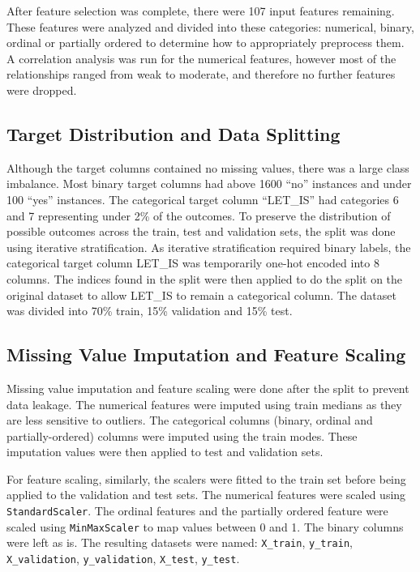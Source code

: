 \documentclass[11pt]{article}
\begin{document}
After feature selection was complete, there were 107 input features remaining. These features were analyzed and divided into these categories: numerical, binary, ordinal or partially ordered to determine how to appropriately preprocess them. A correlation analysis was run for the numerical features, however most of the relationships ranged from weak to moderate, and therefore no further features were dropped.

\subsection{Target Distribution and Data Splitting}

Although the target columns contained no missing values, there was a large class imbalance. Most binary target columns had above 1600 ``no'' instances and under 100 ``yes'' instances. The categorical target column ``LET\_IS'' had categories 6 and 7 representing under 2\% of the outcomes. To preserve the distribution of possible outcomes across the train, test and validation sets, the split was done using iterative stratification. As iterative stratification required binary labels, the categorical target column LET\_IS was temporarily one-hot encoded into 8 columns. The indices found in the split were then applied to do the split on the original dataset to allow LET\_IS to remain a categorical column. The dataset was divided into 70\% train, 15\% validation and 15\% test.

\subsection{Missing Value Imputation and Feature Scaling}

Missing value imputation and feature scaling were done after the split to prevent data leakage. The numerical features were imputed using train medians as they are less sensitive to outliers. The categorical columns (binary, ordinal and partially-ordered) columns were imputed using the train modes. These imputation values were then applied to test and validation sets.

For feature scaling, similarly, the scalers were fitted to the train set before being applied to the validation and test sets. The numerical features were scaled using \texttt{StandardScaler}. The ordinal features and the partially ordered feature were scaled using \texttt{MinMaxScaler} to map values between 0 and 1. The binary columns were left as is. The resulting datasets were named: \texttt{X\_train}, \texttt{y\_train}, \texttt{X\_validation}, \texttt{y\_validation}, \texttt{X\_test}, \texttt{y\_test}.
\end{document}
